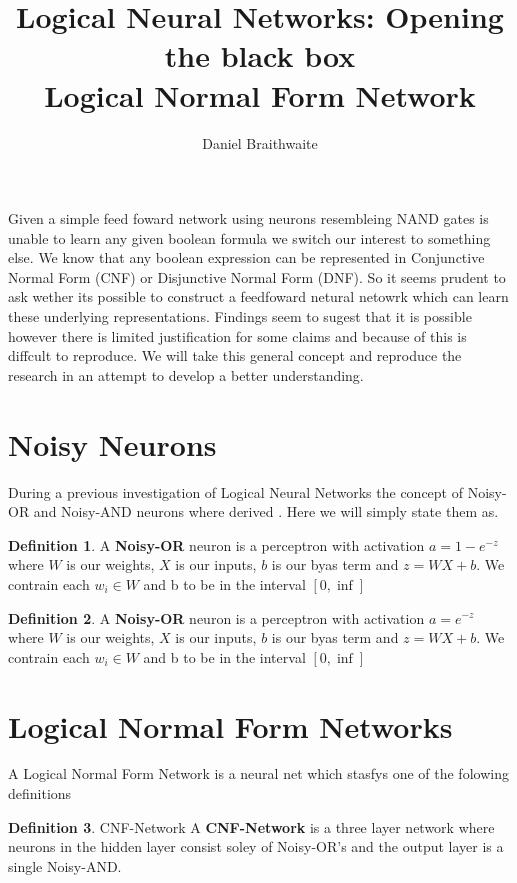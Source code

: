 \documentclass{article}
\title{%
	Logical Neural Networks: Opening the black box\\
	\large Logical Normal Form Network
}
\author{Daniel Braithwaite}
\theoremstyle{definition}
\newtheorem{definition}{Definition}[section]
\begin{document}
\maketitle

Given a simple feed foward network using neurons resembleing NAND gates is unable to learn any given boolean formula we switch our interest to something else. We know that any boolean expression can be represented in Conjunctive Normal Form (CNF) or Disjunctive Normal Form (DNF). So it seems prudent to ask wether its possible to construct a feedfoward netural netowrk which can learn these underlying representations. Findings \cite{herrmann1996backpropagation} seem to sugest that it is possible however there is limited justification for some claims and because of this is diffcult to reproduce. We will take this general concept and reproduce the research in an attempt to develop a better understanding.

\section{Noisy Neurons}
During a previous investigation of Logical Neural Networks the concept of Noisy-OR and Noisy-AND neurons where derived \cite{LearningLogicalActivations}. Here we will simply state them as.

\theoremstyle{definition}
\begin{definition}{}
A \textbf{Noisy-OR} neuron is a perceptron with activation $a = 1 - e^{-z}$ where $W$ is our weights, $X$ is our inputs, $b$ is our byas term and $z = WX + b$. We contrain each $w_i \in W$ and b to be in the interval $[0, \inf]$
\end{definition}

\begin{definition}{}
A \textbf{Noisy-OR} neuron is a perceptron with activation $a = e^{-z}$ where $W$ is our weights, $X$ is our inputs, $b$ is our byas term and $z = WX + b$. We contrain each $w_i \in W$ and b to be in the interval $[0, \inf]$
\end{definition}

\section{Logical Normal Form Networks}
A Logical Normal Form Network is a neural net which stasfys one of the folowing definitions

\theoremstyle{definition}
\begin{definition}{CNF-Network}
A \textbf{CNF-Network} is a three layer network where neurons in the hidden layer consist soley of Noisy-OR's and the output layer is a single Noisy-AND. 
\end{definition}
\end{document}
